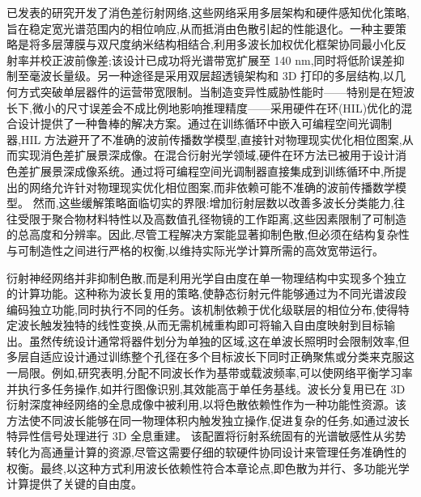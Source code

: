 已发表的研究开发了消色差衍射网络,这些网络采用多层架构和硬件感知优化策略,旨在稳定宽光谱范围内的相位响应,从而抵消由色散引起的性能退化。一种主要策略是将多层薄膜与双尺度纳米结构相结合,利用多波长加权优化框架协同最小化反射率并校正波前像差;该设计已成功将光谱带宽扩展至 140 nm,同时将低阶误差抑制至毫波长量级。另一种途径是采用双层超透镜架构和 3D 打印的多层结构,以几何方式突破单层器件的运营带宽限制。当制造变异性威胁性能时------特别是在短波长下,微小的尺寸误差会不成比例地影响推理精度------采用硬件在环(HIL)优化的混合设计提供了一种鲁棒的解决方案。通过在训练循环中嵌入可编程空间光调制器,HIL 方法避开了不准确的波前传播数学模型,直接针对物理现实优化相位图案,从而实现消色差扩展景深成像。在混合衍射光学领域,硬件在环方法已被用于设计消色差扩展景深成像系统。通过将可编程空间光调制器直接集成到训练循环中,所提出的网络允许针对物理现实优化相位图案,而非依赖可能不准确的波前传播数学模型。\citep{doi_10_1364_oe_461549_b2d41b3f} 然而,这些缓解策略面临切实的界限:增加衍射层数以改善多波长分类能力,往往受限于聚合物材料特性以及高数值孔径物镜的工作距离,这些因素限制了可制造的总高度和分辨率。因此,尽管工程解决方案能显著抑制色散,但必须在结构复杂性与可制造性之间进行严格的权衡,以维持实际光学计算所需的高效宽带运行。\citep{doi_10_1002_adpr_202300310_6647aa64} \citep{doi_10_3390_modelling7010029_9851fe61} \citep{doi_10_1364_oe_461549_b2d41b3f} \citep{doi_10_29026_oea_2021_200008_8948c2c3} \citep{doi_10_1126_sciadv_adj9262_15884f2e}

衍射神经网络并非抑制色散,而是利用光学自由度在单一物理结构中实现多个独立的计算功能。这种称为波长复用的策略,使静态衍射元件能够通过为不同光谱波段编码独立功能,同时执行不同的任务。该机制依赖于优化级联层的相位分布,使得特定波长触发独特的线性变换,从而无需机械重构即可将输入自由度映射到目标输出。虽然传统设计通常将器件划分为单独的区域,这在单波长照明时会限制效率,但多层自适应设计通过训练整个孔径在多个目标波长下同时正确聚焦或分类来克服这一局限。例如,研究表明,分配不同波长作为基带或载波频率,可以使网络平衡学习率并执行多任务操作,如并行图像识别,其效能高于单任务基线。波长分复用已在 3D 衍射深度神经网络的全息成像中被利用,以将色散依赖性作为一种功能性资源。该方法使不同波长能够在同一物理体积内触发独立操作,促进复杂的任务,如通过波长特异性信号处理进行 3D 全息重建。\citep{doi_10_1109_acp_ipoc63121_2024_10809872_a7935774} 该配置将衍射系统固有的光谱敏感性从劣势转化为高通量计算的资源,尽管这需要仔细的软硬件协同设计来管理任务准确性的权衡。最终,以这种方式利用波长依赖性符合本章论点,即色散为并行、多功能光学计算提供了关键的自由度。\citep{doi_10_1038_s41377_022_00903_8_098356a7} \citep{doi_10_1364_prj_576203_ae347fba} \citep{doi_10_1364_ol_460186_da35c128} \citep{doi_10_1155_2020_9748380_13fcb0d2} \citep{s2_88f87b34acdb11cf20ad16d6fbdd5399e8617f8f_a548a720}

